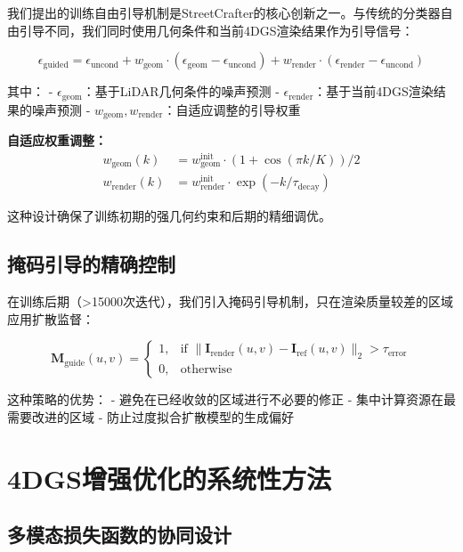 我们提出的训练自由引导机制是StreetCrafter的核心创新之一。与传统的分类器自由引导不同，我们同时使用几何条件和当前4DGS渲染结果作为引导信号：

\begin{equation}
\epsilon_{\text{guided}} = \epsilon_{\text{uncond}} + w_{\text{geom}} \cdot (\epsilon_{\text{geom}} - \epsilon_{\text{uncond}}) + w_{\text{render}} \cdot (\epsilon_{\text{render}} - \epsilon_{\text{uncond}})
\label{eq:dual_guidance}
\end{equation}

其中：
- $\epsilon_{\text{geom}}$：基于LiDAR几何条件的噪声预测
- $\epsilon_{\text{render}}$：基于当前4DGS渲染结果的噪声预测
- $w_{\text{geom}}, w_{\text{render}}$：自适应调整的引导权重

\textbf{自适应权重调整：}
\begin{align}
w_{\text{geom}}(k) &= w_{\text{geom}}^{\text{init}} \cdot (1 + \cos(\pi k / K)) / 2 \\
w_{\text{render}}(k) &= w_{\text{render}}^{\text{init}} \cdot \exp(-k / \tau_{\text{decay}})
\label{eq:adaptive_guidance_weights}
\end{align}

这种设计确保了训练初期的强几何约束和后期的精细调优。

\subsection{掩码引导的精确控制}

在训练后期（>15000次迭代），我们引入掩码引导机制，只在渲染质量较差的区域应用扩散监督：

\begin{equation}
\mathbf{M}_{\text{guide}}(u,v) = \begin{cases}
1, & \text{if } \|\mathbf{I}_{\text{render}}(u,v) - \mathbf{I}_{\text{ref}}(u,v)\|_2 > \tau_{\text{error}} \\
0, & \text{otherwise}
\end{cases}
\label{eq:masked_guidance}
\end{equation}

这种策略的优势：
- 避免在已经收敛的区域进行不必要的修正
- 集中计算资源在最需要改进的区域
- 防止过度拟合扩散模型的生成偏好

\section{4DGS增强优化的系统性方法}

\subsection{多模态损失函数的协同设计}

